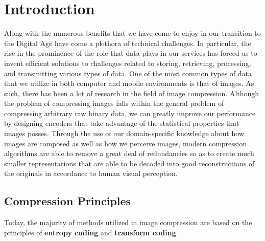 \documentclass[review,onefignum,onetabnum]{siamart190516}
\begin{document}
\maketitle

\section{Introduction}
Along with the numerous benefits that we have come to enjoy in our transition to the Digital Age
have come a plethora of technical challenges. In particular, the rise in the prominence
of the role that data plays in our services has forced us to invent efficient solutions 
to challenges related to storing, retrieving, processing, and transmitting various types of 
data. One of the most common types of data that we utilize in both computer and mobile environments
is that of images. As such, there has been a lot of research in the field of image compression.
Although the problem of compressing images falls within the general problem of compressing arbitrary
raw binary data, we can greatly improve our performance by designing encoders that take 
advantage of the statistical properties that images posses. Through the use of our domain-specific
knowledge about how images are composed as well as how we perceive images, 
modern compression algorithms are able to remove a great deal of redundancies
so as to create much smaller representations that are able to be decoded into 
good reconstructions of the originals in accordance to human visual perception.

\subsection{Compression Principles}

Today, the majority of methods utilized in image compression are based on the
principles of \textbf{entropy coding} and \textbf{transform coding}. 
\end{document}
